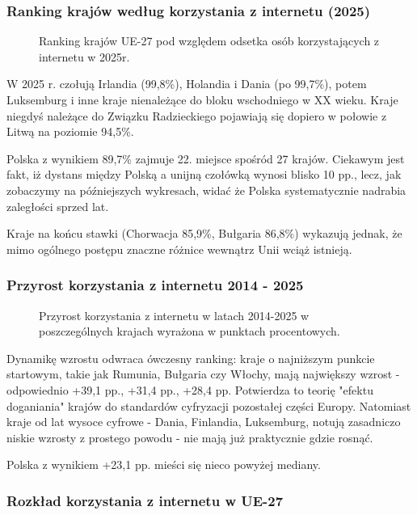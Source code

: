 \documentclass[12pt]{article}
\begin{document}
\subsubsection{Ranking krajów według korzystania z internetu (2025)}

\begin{figure}[H]
    
    \caption{Ranking krajów UE-27 pod względem odsetka osób korzystających z internetu w 2025r.}
\end{figure}

W 2025 r. czołują Irlandia (99,8\%), Holandia i Dania (po 99,7\%), potem Luksemburg i inne kraje nienależące do bloku wschodniego w XX wieku. 
Kraje niegdyś należące do Związku Radzieckiego pojawiają się dopiero w połowie z Litwą na poziomie 94,5\%. 

Polska z wynikiem 89,7\% zajmuje 22. miejsce spośród 27 krajów. Ciekawym jest fakt, iż dystans między Polską a unijną czołówką wynosi blisko 10 pp., 
lecz, jak zobaczymy na późniejszych wykresach, widać że Polska systematycznie nadrabia zaległości sprzed lat.

Kraje na końcu stawki (Chorwacja 85,9\%, Bułgaria 86,8\%) wykazują jednak, że mimo ogólnego postępu znaczne różnice wewnątrz Unii wciąż istnieją.




\subsubsection{Przyrost korzystania z internetu 2014 - 2025}

\begin{figure}[H]
    
    \caption{Przyrost korzystania z internetu w latach 2014-2025 w poszczególnych krajach wyrażona w punktach procentowych.}
\end{figure}

Dynamikę wzrostu odwraca ówczesny ranking: kraje o najniższym punkcie startowym, takie jak Rumunia, Bułgaria czy Włochy,
mają największy wzrost - odpowiednio +39,1 pp., +31,4 pp., +28,4 pp. Potwierdza to teorię "efektu doganiania" krajów do standardów 
cyfryzacji pozostałej części Europy. Natomiast kraje od lat wysoce cyfrowe - Dania, Finlandia, Luksemburg, 
notują zasadniczo niskie wzrosty z prostego powodu - nie mają już praktycznie gdzie rosnąć. 

Polska z wynikiem +23,1 pp. mieści się nieco powyżej mediany. 


\subsubsection{Rozkład korzystania z internetu w UE-27}
\end{document}
